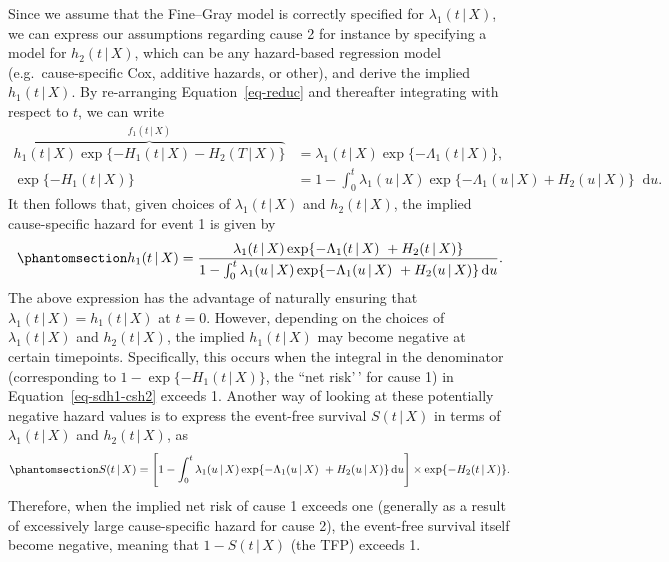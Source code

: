 \documentclass[
  letterpaper,
  paper=240mm:170mm,
  twoside=true,
  open=right,
  fontsize=10pt,
  pagesize=false,
  BCOR=15mm,
  DIV=14,
  headinclude=true,
  footinclude=false,
  headsepline=on]{scrbook}
\newcommand{\given}{\,|\,}
\newcommand\diff{\mathop{}\!\mathrm{d}}
\begin{document}
Since we assume that the Fine--Gray model is correctly specified for
\(\lambda_1(t \given X)\), we can express our assumptions regarding
cause 2 for instance by specifying a model for \(h_2(t \given X)\),
which can be any hazard-based regression model (e.g.~cause-specific Cox,
additive hazards, or other), and derive the implied \(h_1(t \given X)\).
By re-arranging Equation~\ref{eq-reduc} and thereafter integrating with
respect to \(t\), we can write
\begin{align*} %
    \overbrace{h_1(t \given X)\exp\{-H_1(t \given X)- H_2(T \given X)\}}^{f_1(t \given X)} &= \lambda_1(t \given X)\exp\{-\Lambda_1(t \given X)\}, \\
    \exp\{-H_1(t \given X)\} &= 1 -\int_{0}^{t} \lambda_1(u \given X)\exp\{-\Lambda_1(u \given X) + H_2(u \given X)\}\diff u.
\end{align*} It then follows that, given choices of
\(\lambda_1(t \given X)\) and \(h_2(t \given X)\), the implied
cause-specific hazard for event 1 is given by
\begin{equation}\phantomsection\label{eq-sdh1-csh2}{
h_1(t \given X) = \frac{\lambda_1(t \given X)\exp\{-\Lambda_1(t \given X)\ + H_2(t \given X)\}}{1 -\int_{0}^{t} \lambda_1(u \given X)\exp\{-\Lambda_1(u \given X)\ + H_2(u \given X)\}\diff u}.
}\end{equation} The above expression has the advantage of naturally
ensuring that \(\lambda_1(t \given X) = h_1(t \given X)\) at \(t = 0\).
However, depending on the choices of \(\lambda_1(t \given X)\) and
\(h_2(t \given X)\), the implied \(h_1(t \given X)\) may become negative
at certain timepoints. Specifically, this occurs when the integral in
the denominator (corresponding to \(1 - \exp\{-H_1(t \given X)\}\), the
``net risk'\,' for cause 1) in Equation~\ref{eq-sdh1-csh2} exceeds 1.
Another way of looking at these potentially negative hazard values is to
express the event-free survival \(S(t \given X)\) in terms of
\(\lambda_1(t \given X)\) and \(h_2(t \given X)\), as
\begin{equation}\phantomsection\label{eq-efs-reduc}{
S(t \given X) = \Bigg[1 -\int_{0}^{t} \lambda_1(u \given X)\exp\{-\Lambda_1(u \given X)\ + H_2(u \given X)\}\diff u\Bigg] \times \exp \{-H_2(t \given X)\}.
}\end{equation} Therefore, when the implied net risk of cause 1 exceeds
one (generally as a result of excessively large cause-specific hazard
for cause 2), the event-free survival itself become negative, meaning
that \(1 - S(t \given X)\) (the TFP) exceeds 1.
\end{document}
